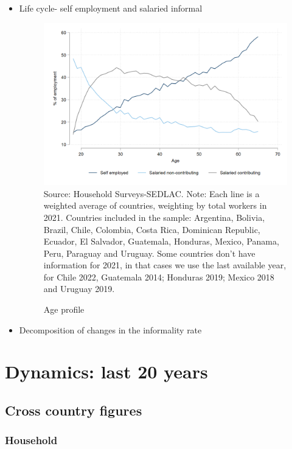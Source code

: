\documentclass[english]{article}
\begin{document}
\begin{itemize}
\begin{itemize}
\item Life cycle- self employment and salaried informal
 \begin{figure}[!htb]
        \justifying
        \caption{Age profile}     
        \includegraphics[scale=.3]{latex/figures/Snapshot/age_profile.png}
        \label{fig:age_pro}
        \footnotesize{Source: Household Surveys-SEDLAC.}
        \footnotesize{Note: Each line is a weighted average of countries, weighting by total workers in 2021. Countries included in the sample: Argentina, Bolivia, Brazil, Chile, Colombia, Costa Rica, Dominican Republic, Ecuador, El Salvador, Guatemala, Honduras, Mexico, Panama, Peru, Paraguay and Uruguay. Some countries don’t have information for 2021, in that cases we use the last available year, for Chile 2022, Guatemala 2014; Honduras 2019; Mexico 2018 and Uruguay 2019.}
        \end{figure}
\item Decomposition of changes in the informality rate

\end{itemize}

     
     
\section{Dynamics: last 20 years}  

\subsection{Cross country figures}
\subsubsection{Household}


\end{itemize}
\end{document}
